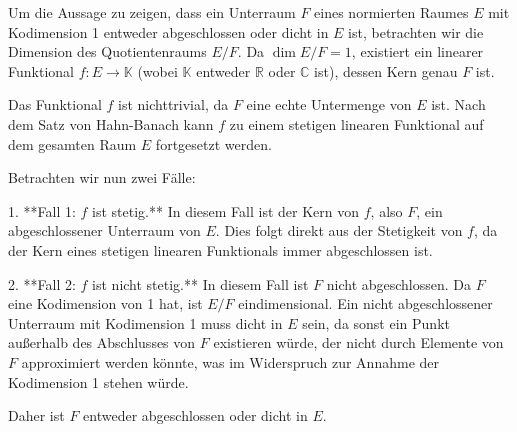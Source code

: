 Um die Aussage zu zeigen, dass ein Unterraum $F$ eines normierten Raumes $E$ mit Kodimension 1 entweder abgeschlossen oder dicht in $E$ ist, betrachten wir die Dimension des Quotientenraums $E/F$. Da $\operatorname{dim} E / F = 1$, existiert ein linearer Funktional $f: E \to \mathbb{K}$ (wobei $\mathbb{K}$ entweder $\mathbb{R}$ oder $\mathbb{C}$ ist), dessen Kern genau $F$ ist. 

Das Funktional $f$ ist nichttrivial, da $F$ eine echte Untermenge von $E$ ist. Nach dem Satz von Hahn-Banach kann $f$ zu einem stetigen linearen Funktional auf dem gesamten Raum $E$ fortgesetzt werden. 

Betrachten wir nun zwei Fälle:

1. **Fall 1: $f$ ist stetig.** In diesem Fall ist der Kern von $f$, also $F$, ein abgeschlossener Unterraum von $E$. Dies folgt direkt aus der Stetigkeit von $f$, da der Kern eines stetigen linearen Funktionals immer abgeschlossen ist.

2. **Fall 2: $f$ ist nicht stetig.** In diesem Fall ist $F$ nicht abgeschlossen. Da $F$ eine Kodimension von 1 hat, ist $E/F$ eindimensional. Ein nicht abgeschlossener Unterraum mit Kodimension 1 muss dicht in $E$ sein, da sonst ein Punkt außerhalb des Abschlusses von $F$ existieren würde, der nicht durch Elemente von $F$ approximiert werden könnte, was im Widerspruch zur Annahme der Kodimension 1 stehen würde.

Daher ist $F$ entweder abgeschlossen oder dicht in $E$.